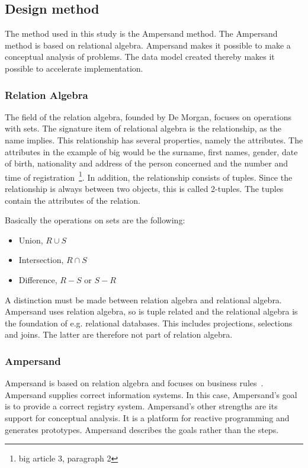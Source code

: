 \subsection{Design method} \label{design_method}
The method used in this study is the Ampersand method.
The Ampersand method is based on relational algebra.
Ampersand makes it possible to make a conceptual analysis of problems. The data model created thereby makes it possible to accelerate implementation.


\subsubsection{Relation Algebra} \label{relation_algebra}
The field of the relation algebra, founded by De Morgan, focuses on operations with sets.
The signature item of relational algebra is the relationship, as the name implies.
This relationship has several properties, namely the attributes.
The attributes in the example of \acrshort{big} would be the surname, first names, gender, date of birth, nationality and address of the person concerned and the number and time of registration~\footnote{\acrlong{big} article 3, paragraph 2}.
In addition, the relationship consists of tuples.
Since the relationship is always between two objects, this is called 2-tuples.
The tuples contain the attributes of the relation.

Basically the operations on sets are the following:
\begin{itemize}
\item Union, $R \cup S$ %
    \item Intersection, $R \cap S$ %
    \item Difference, $R - S$ or $S - R$ %
\end{itemize}
A distinction must be made between relation algebra and relational algebra.
Ampersand uses relation algebra, so is tuple related and the relational algebra is the foundation of e.g. relational databases.
This includes projections, selections and joins.
The latter are therefore not part of relation algebra.


\subsubsection{Ampersand} \label{ampersand}
Ampersand is based on relation algebra and focuses on business rules~.
Ampersand supplies correct information systems.
In this case, Ampersand's goal is to provide a correct registry system.
Ampersand's other strengths are its support for conceptual analysis.
It is a platform for reactive programming and generates prototypes.
Ampersand describes the goals rather than the steps.

